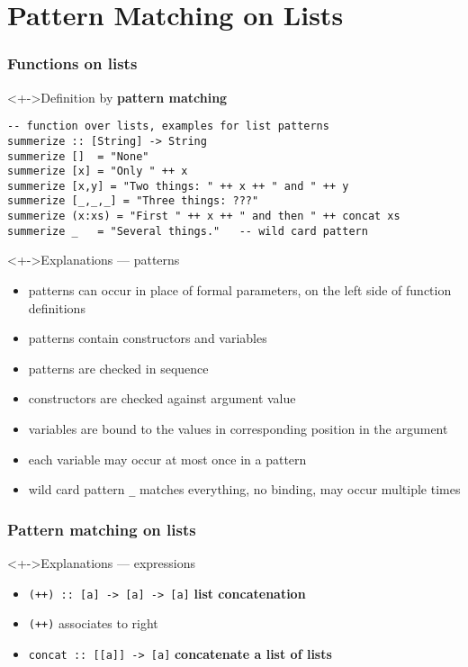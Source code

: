 \documentclass{beamer}
\begin{document}
\section{Pattern Matching on Lists}
\begin{frame}[fragile]
  \frametitle{Functions on lists}
  \begin{block}<+->{Definition by \textbf{pattern matching}}
\begin{lstlisting}
-- function over lists, examples for list patterns
summerize :: [String] -> String
summerize []  = "None"
summerize [x] = "Only " ++ x
summerize [x,y] = "Two things: " ++ x ++ " and " ++ y
summerize [_,_,_] = "Three things: ???"
summerize (x:xs) = "First " ++ x ++ " and then " ++ concat xs
summerize _   = "Several things."   -- wild card pattern
\end{lstlisting}
  \end{block}
  \begin{alertblock}<+->{Explanations --- patterns}
    \tiny{}
    \begin{itemize}
    \item patterns can occur in place of formal parameters, on the
      left side of function definitions
    \item patterns contain constructors and variables
    \item patterns are checked in sequence
    \item constructors are checked against argument value
    \item variables are bound to the values in
      corresponding position in the argument
    \item each variable may occur at most once in a pattern
    \item wild card pattern \verb!_! matches everything, no binding, may occur multiple times
    \end{itemize}
  \end{alertblock}

  \end{frame}
\begin{frame}[fragile]
  \frametitle{Pattern matching on lists}
\begin{alertblock}<+->{Explanations --- expressions}
    \begin{itemize}
    \item  \lstinline{(++) :: [a] -> [a] -> [a]} \textbf{list concatenation}
    \item  \lstinline{(++)} associates to right
    \item \lstinline{concat :: [[a]] -> [a]} \textbf{concatenate a
        list of lists}
    \end{itemize}
  \end{alertblock}
  \end{frame}
\end{document}
